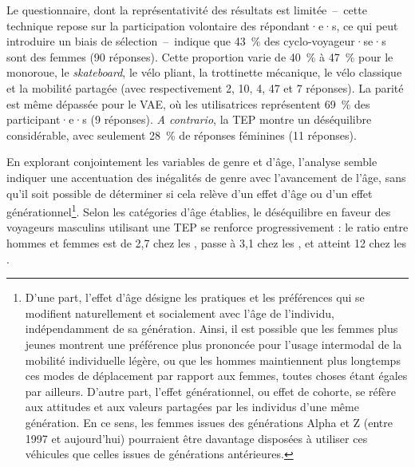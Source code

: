 \begin{refsegment}
Le questionnaire, dont la représentativité des résultats est limitée~–~cette technique repose sur la participation volontaire des répondant·e·s, ce qui peut introduire un biais de sélection~–~indique que 43~\% des cyclo-voyageur·se·s sont des femmes (90 réponses). Cette proportion varie de 40~\% à 47~\% pour le monoroue, le \textsl{skateboard}, le vélo pliant, la trottinette mécanique, le vélo classique et la mobilité partagée (avec respectivement 2, 10, 4, 47 et 7 réponses). La parité est même dépassée pour le \acrshort{VAE}, où les utilisatrices représentent 69~\% des participant·e·s (9 réponses). \textsl{A contrario}, la \acrshort{TEP} montre un déséquilibre considérable, avec seulement 28~\% de réponses féminines (11 réponses).%

En explorant conjointement les variables de genre et d'âge, l'analyse semble indiquer une accentuation des inégalités de genre avec l'avancement de l'âge, sans qu'il soit possible de déterminer si cela relève d'un effet d'âge ou d'un effet générationnel\footnote{
        D'une part, l'effet d'âge désigne les pratiques et les préférences qui se modifient naturellement et socialement avec l'âge de l'individu, indépendamment de sa génération. Ainsi, il est possible que les femmes plus jeunes montrent une préférence plus prononcée pour l'usage intermodal de la mobilité individuelle légère, ou que les hommes maintiennent plus longtemps ces modes de déplacement par rapport aux femmes, toutes choses étant égales par ailleurs. D'autre part, l'effet générationnel, ou effet de cohorte, se réfère aux attitudes et aux valeurs partagées par les individus d'une même génération. En ce sens, les femmes issues des générations Alpha et Z (entre 1997 et aujourd'hui) pourraient être davantage disposées à utiliser ces véhicules que celles issues de générations antérieures.
}. Selon les catégories d'âge établies, le déséquilibre en faveur des voyageurs masculins utilisant une \acrshort{TEP} se renforce progressivement : le ratio entre hommes et femmes est de 2,7 chez les , passe à 3,1 chez les , et atteint 12 chez les .%


\end{refsegment}
